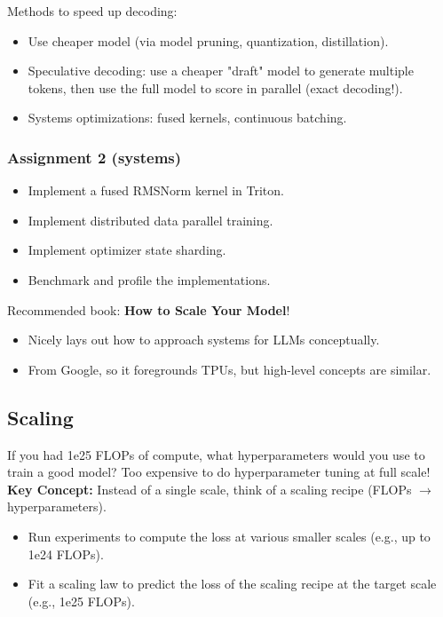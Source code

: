 \documentclass[12pt,twoside]{article}
\begin{document}
Methods to speed up decoding:

\begin{itemize}
    \item Use cheaper model (via model pruning, quantization, distillation).
    \item Speculative decoding: use a cheaper "draft" model to generate multiple tokens, then use the full model to score in parallel (exact decoding!).
    \item Systems optimizations: fused kernels, continuous batching.
\end{itemize}

\subsubsection*{Assignment 2 (systems)}

\begin{itemize}
    \item Implement a fused RMSNorm kernel in Triton.
    \item Implement distributed data parallel training.
    \item Implement optimizer state sharding.
    \item Benchmark and profile the implementations.
\end{itemize}

Recommended book: \textbf{How to Scale Your Model}!

\begin{itemize}
    \item Nicely lays out how to approach systems for LLMs conceptually.
    \item From Google, so it foregrounds TPUs, but high-level concepts are similar.
\end{itemize}

\subsection*{Scaling}

If you had 1e25 FLOPs of compute, what hyperparameters would you use to train a good model? Too expensive to do hyperparameter tuning at full scale!  \\

\textbf{Key Concept:} Instead of a single scale, think of a scaling recipe (FLOPs \(\to\) hyperparameters).

\begin{itemize}
    \item Run experiments to compute the loss at various smaller scales (e.g., up to 1e24 FLOPs).
    \item Fit a scaling law to predict the loss of the scaling recipe at the target scale (e.g., 1e25 FLOPs).
\end{itemize}
\end{document}
